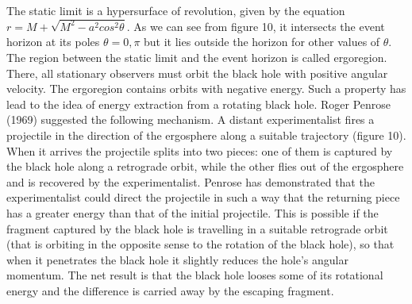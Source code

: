 \documentclass{lamuphys}
\begin{document}
The static limit is a hypersurface of revolution,
given by the equation $r = M + \sqrt{M^2 - a^2 cos^2\theta}$. As we
can see from figure 10, it intersects the event horizon at
its poles $\theta = 0,\pi$ but it lies outside the horizon for other values
of $\theta$. The region between the static limit and the event horizon is
called ergoregion. There, all stationary observers must orbit the black hole
with positive angular velocity. The ergoregion contains orbits with negative
energy. Such a property has lead to the idea of energy extraction from a
rotating black hole.  Roger Penrose (1969) suggested the following mechanism.
A distant experimentalist
fires a projectile in the direction of the ergosphere along
a suitable trajectory (figure 10). When it arrives the projectile splits into two
pieces: one of them is captured by the black hole along a retrograde orbit,
while the other flies out of the ergosphere and is recovered by the
experimentalist.
Penrose has demonstrated that the experimentalist could direct the
projectile in such a way that the returning piece has a greater energy than
that of the initial projectile. This is possible if the fragment captured by the
black hole is travelling in a suitable retrograde orbit (that is orbiting in
the opposite sense to the rotation of the black hole), so that when it
penetrates the black hole it slightly reduces the hole's angular momentum. The
net result is that the black hole looses some of its rotational energy and the
difference is carried away by the escaping fragment. 
\end{document}
